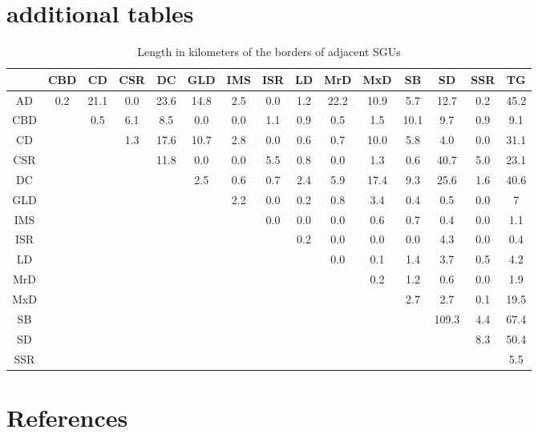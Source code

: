 \documentclass[preprint,12pt,authoryear]{elsarticle}
\begin{document}
\section*{additional tables}
\begin{table}[ht]
\centering
\tabcolsep=0.06cm
\small
\begin{tabular}{ccccccccccccccc}
  \hline
 & CBD & CD & CSR & DC & GLD & IMS & ISR & LD  & MrD & MxD & SB & SD & SSR & TG \\ 
  \hline
AD & 0.2 & 21.1 & 0.0 & 23.6 & 14.8 & 2.5 & 0.0 & 1.2  & 22.2 & 10.9 & 5.7 & 12.7 & 0.2 & 45.2 \\ 
  CBD &  & 0.5 & 6.1 & 8.5 & 0.0 & 0.0 & 1.1 & 0.9  & 0.5 & 1.5 & 10.1 & 9.7 & 0.9 & 9.1 \\ 
  CD &  &  & 1.3 & 17.6 & 10.7 & 2.8 & 0.0 & 0.6  & 0.7 & 10.0 & 5.8 & 4.0 & 0.0 & 31.1\\ 
  CSR &  &  &  & 11.8 & 0.0 & 0.0 & 5.5 & 0.8  & 0.0 & 1.3 & 0.6 & 40.7 & 5.0 & 23.1 \\ 
  DC &  &  &  &  & 2.5 & 0.6 & 0.7 & 2.4  & 5.9 & 17.4 & 9.3 & 25.6 & 1.6 & 40.6 \\ 
  GLD &  &  &  &  &  & 2.2 & 0.0 & 0.2  & 0.8 & 3.4 & 0.4 & 0.5 & 0.0 & 7 \\ 
  IMS &  &  &  &  &  &  & 0.0 & 0.0  & 0.0 & 0.6 & 0.7 & 0.4 & 0.0 & 1.1 \\ 
  ISR &  &  &  &  &  &  &  & 0.2 & 0.0 & 0.0 & 0.0 & 4.3 & 0.0 & 0.4 \\ 
  LD &  &  &  &  &  &  &  &   & 0.0 & 0.1 & 1.4 & 3.7 & 0.5 & 4.2 \\ 
  MrD  &  &  &  &  &  &  &  &  &  & 0.2 & 1.2 & 0.6 & 0.0 & 1.9 \\ 
  MxD  &  &  &  &  &  &  &  &  &  &  & 2.7 & 2.7 & 0.1 & 19.5 \\ 
  SB  &  &  &  &  &  &  &  &  &  &  &  & 109.3 & 4.4 & 67.4\\ 
  SD  &  &  &  &  &  &  &  &  &  &  &  &  & 8.3 & 50.4 \\ 
  SSR  &  &  &  &  &  &  &  &  &  &  &  &  &  & 5.5 \\ 
   \hline
\end{tabular}
\caption{Length in kilometers of the borders of adjacent SGUs} 
\label{table:borderlength}
\end{table}
\section*{References}

\end{document}
